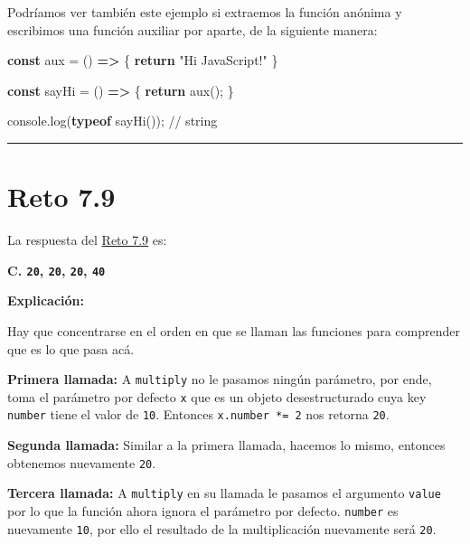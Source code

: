 \documentclass[
  letterpaper,
  DIV=11,
  numbers=noendperiod]{scrreprt}
\newenvironment{Shaded}{\begin{snugshade}}{\end{snugshade}}
\newcommand{\BuiltInTok}[1]{\textcolor[rgb]{0.00,0.23,0.31}{#1}}
\newcommand{\CommentTok}[1]{\textcolor[rgb]{0.37,0.37,0.37}{#1}}
\newcommand{\ControlFlowTok}[1]{\textcolor[rgb]{0.00,0.23,0.31}{\textbf{#1}}}
\newcommand{\FunctionTok}[1]{\textcolor[rgb]{0.28,0.35,0.67}{#1}}
\newcommand{\KeywordTok}[1]{\textcolor[rgb]{0.00,0.23,0.31}{\textbf{#1}}}
\newcommand{\NormalTok}[1]{\textcolor[rgb]{0.00,0.23,0.31}{#1}}
\newcommand{\OperatorTok}[1]{\textcolor[rgb]{0.37,0.37,0.37}{#1}}
\newcommand{\StringTok}[1]{\textcolor[rgb]{0.13,0.47,0.30}{#1}}
\begin{document}
Podríamos ver también este ejemplo si extraemos la función anónima y
escribimos una función auxiliar por aparte, de la siguiente manera:

\begin{Shaded}
\begin{Highlighting}[]
\KeywordTok{const}\NormalTok{ aux }\OperatorTok{=}\NormalTok{ () }\KeywordTok{=\textgreater{}}\NormalTok{ \{}
  \ControlFlowTok{return} \StringTok{"Hi JavaScript!"}
\NormalTok{\}}

\KeywordTok{const}\NormalTok{ sayHi }\OperatorTok{=}\NormalTok{ () }\KeywordTok{=\textgreater{}}\NormalTok{ \{}
  \ControlFlowTok{return} \FunctionTok{aux}\NormalTok{()}\OperatorTok{;}
\NormalTok{\}}

\BuiltInTok{console}\OperatorTok{.}\FunctionTok{log}\NormalTok{(}\KeywordTok{typeof} \FunctionTok{sayHi}\NormalTok{())}\OperatorTok{;} \CommentTok{// string}
\end{Highlighting}
\end{Shaded}

\begin{center}\rule{0.5\linewidth}{0.5pt}\end{center}

\section{Reto 7.9}\label{sec-sol-cap7-reto9}

La respuesta del \hyperref[sec-cap7-reto9]{Reto 7.9} es:

\textbf{C. \texttt{20}, \texttt{20}, \texttt{20}, \texttt{40}}

\textbf{Explicación:}

Hay que concentrarse en el orden en que se llaman las funciones para
comprender que es lo que pasa acá.

\textbf{Primera llamada:} A \texttt{multiply} no le pasamos ningún
parámetro, por ende, toma el parámetro por defecto \texttt{x} que es un
objeto desestructurado cuya key \texttt{number} tiene el valor de
\texttt{10}. Entonces \texttt{x.number\ *=\ 2} nos retorna \texttt{20}.

\textbf{Segunda llamada:} Similar a la primera llamada, hacemos lo
mismo, entonces obtenemos nuevamente \texttt{20}.

\textbf{Tercera llamada:} A \texttt{multiply} en su llamada le pasamos
el argumento \texttt{value} por lo que la función ahora ignora el
parámetro por defecto. \texttt{number} es nuevamente \texttt{10}, por
ello el resultado de la multiplicación nuevamente será \texttt{20}.
\end{document}
